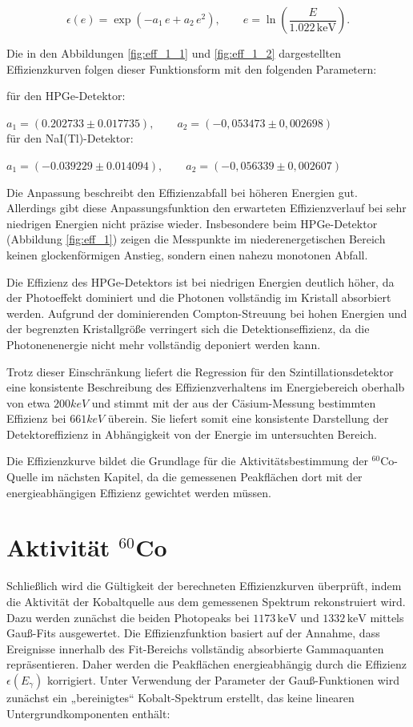 \[\epsilon(e) = \exp\!\left(-a_1\, e + a_2\, e^2\right),
\qquad e = \ln\!\left(\frac{E}{1.022\,\text{keV}}\right).
\tag{8}
\]

Die in den Abbildungen \ref{fig:eff_1_1} und \ref{fig:eff_1_2} dargestellten Effizienzkurven folgen dieser Funktionsform mit den folgenden Parametern:

für den HPGe-Detektor:

$a_1 = (0.202733 \pm 0.017735), \qquad a_2 = (-0,053473 \pm 0,002698)$\\


für den NaI(Tl)-Detektor:

$a_1 = (-0.039229 \pm 0.014094), \qquad a_2 = (-0,056339 \pm 0,002607)$

Die Anpassung beschreibt den Effizienzabfall bei höheren Energien gut. Allerdings gibt diese Anpassungsfunktion den erwarteten Effizienzverlauf bei sehr niedrigen Energien nicht präzise wieder. Insbesondere beim HPGe-Detektor (Abbildung \ref{fig:eff_1}) zeigen die Messpunkte im niederenergetischen Bereich keinen glockenförmigen Anstieg, sondern einen nahezu monotonen Abfall.

Die Effizienz des HPGe-Detektors ist bei niedrigen Energien deutlich höher, da der Photoeffekt dominiert und die Photonen vollständig im Kristall absorbiert werden. Aufgrund der dominierenden Compton-Streuung bei hohen Energien und der begrenzten Kristallgröße verringert sich die Detektionseffizienz, da die Photonenenergie nicht mehr vollständig deponiert werden kann.

Trotz dieser Einschränkung liefert die Regression für den Szintillationsdetektor eine konsistente Beschreibung des Effizienzverhaltens im Energiebereich oberhalb von etwa $200keV$ und stimmt mit der aus der Cäsium-Messung bestimmten Effizienz bei $661keV$ überein. Sie liefert somit eine konsistente Darstellung der Detektoreffizienz in Abhängigkeit von der Energie im untersuchten Bereich.

Die Effizienzkurve bildet die Grundlage für die Aktivitätsbestimmung der $^{60}$Co-Quelle im nächsten Kapitel, da die gemessenen Peakflächen dort mit der energieabhängigen Effizienz gewichtet werden müssen.

\chapter{Aktivität $^{60}$Co}
Schließlich wird die Gültigkeit der berechneten Effizienzkurven überprüft, indem die Aktivität der Kobaltquelle aus dem gemessenen Spektrum rekonstruiert wird. Dazu werden zunächst die beiden Photopeaks bei $1173\,\mathrm{keV}$ und $1332\,\mathrm{keV}$ mittels Gauß-Fits ausgewertet. Die Effizienzfunktion basiert auf der Annahme, dass Ereignisse innerhalb des Fit-Bereichs vollständig absorbierte Gammaquanten repräsentieren. Daher werden die Peakflächen energieabhängig durch die Effizienz $\epsilon(E_\gamma)$ korrigiert.
Unter Verwendung der Parameter der Gauß-Funktionen wird zunächst ein „bereinigtes“ Kobalt-Spektrum erstellt, das keine linearen Untergrundkomponenten enthält:


